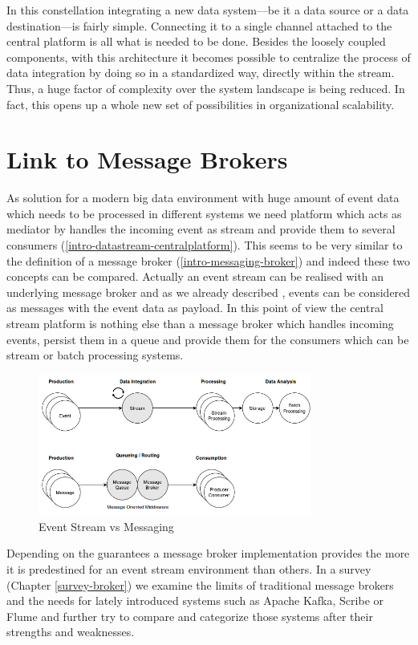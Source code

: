 In this constellation integrating a new data system---be it a data
source or a data destination---is fairly simple. Connecting it to a single
channel attached to the central platform is all what is needed to be done. Besides the
loosely coupled components, with this architecture it becomes possible to
centralize the process of data integration by doing so in a standardized way,
directly within the stream. Thus, a huge factor of complexity over the system
landscape is being reduced. In fact, this opens up a whole new set of
possibilities in organizational scalability. 

\newpage
\section{Link to Message Brokers}
As solution for a modern big data environment with huge amount of event data
which needs to be processed in different systems we need platform which acts as
mediator by handles the incoming event as stream and provide them to several
consumers (\ref{intro-datastream-centralplatform}). This seems to be very similar to
the definition of a message broker (\ref{intro-messaging-broker}) and indeed
these two concepts can be compared. Actually an event stream can be realised
with an underlying message broker and as we already described , events
can be considered as messages with the event data as payload. In this point of
view the central stream platform is nothing else than a message broker which
handles incoming events, persist them in a queue and provide them for the
consumers which can be stream or batch processing systems. 
\begin{figure}[H]
    \centering
    \includegraphics[width=0.8\textwidth]{images/messaging-vs-streaming.png}
    \caption{Event Stream vs Messaging}
    \label{fig:messaging-vs-streaming}
\end{figure}
Depending on the guarantees a message broker implementation provides the more it
is predestined for an event stream environment than others. In a survey (Chapter
\ref{survey-broker}) we examine the limits of traditional message brokers and
the needs for lately introduced systems such as Apache Kafka\cite{apachekafka},
Scribe\cite{scribe} or Flume\cite{apacheflume} and further try to compare and
categorize those systems after their strengths and weaknesses.

